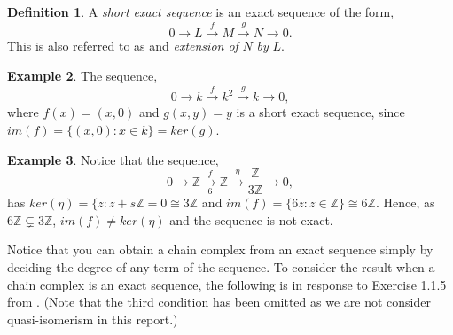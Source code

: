 \documentclass[11.5pt, twoside, a4paper, titlepage]{report}
\providecommand{\bb}[1]{\mathbb{#1}}
\theoremstyle{definition}
\newtheorem{mydef}{Definition}[section]
\newtheorem{eg}[mydef]{Example}
\theoremstyle{plain}
\begin{document}
\begin{mydef}
A \emph{short exact sequence} is an exact sequence of the form,
\begin{equation*}
0\xrightarrow{}L\xrightarrow{f}M\xrightarrow{g}N\xrightarrow{}0.
\end{equation*}
This is also referred to as and \emph{extension of} $N$ \emph{by} $L$.
\end{mydef}

\begin{eg}
The sequence,
\begin{equation*}
0\xrightarrow{} k \xrightarrow{f} k^2 \xrightarrow{g} k \xrightarrow{} 0,
\end{equation*}
where $f(x)=(x,0)$ and $g(x,y)=y$ is a short exact sequence, since $im(f)=\{(x,0): x\in k\}=ker(g)$.
\end{eg}

\begin{eg}
Notice that the sequence, 
\begin{equation*}
0\xrightarrow{}\bb{Z}\xrightarrow[6]{f}\bb{Z}\xrightarrow{\eta}\frac{\bb{Z}}{3\bb{Z}}\xrightarrow{} 0,
\end{equation*}
has $ker(\eta)=\{z:z+s\bb{Z}=0\cong 3\bb{Z}$ and $im(f)=\{6z:z\in \bb{Z}\}\cong 6\bb{Z}$. Hence, as $6\bb{Z}\subsetneq 3\bb{Z}$, $im(f)\neq ker(\eta)$ and the sequence is not exact.
\end{eg}

Notice that you can obtain a chain complex from an exact sequence simply by deciding the degree of any term of the sequence. To consider the result when a chain complex is an exact sequence, the following is in response to Exercise 1.1.5 from \cite{Weibel}. (Note that the third condition has been omitted as we are not consider quasi-isomerism in this report.)
\end{document}
